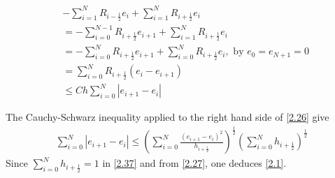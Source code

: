 \documentclass[a4paper]{article}
\numberwithin{equation}{section}
\begin{document}
\begin{align}
& - \sum\limits_{i = 1}^N {{R_{i - \frac{1}{2}}}{e_i}}  + \sum\limits_{i = 1}^N {{R_{i + \frac{1}{2}}}{e_i}} \\
  &=  - \sum\limits_{i = 0}^{N - 1} {{R_{i + \frac{1}{2}}}{e_{i + 1}}}  + \sum\limits_{i = 1}^N {{R_{i + \frac{1}{2}}}{e_i}} \\
& =  - \sum\limits_{i = 0}^N {{R_{i + \frac{1}{2}}}{e_{i + 1}}}  + \sum\limits_{i = 0}^N {{R_{i + \frac{1}{2}}}{e_i}} ,\mbox{ by } {e_0} = {e_{N + 1}} = 0\\
& = \sum\limits_{i = 0}^N {{R_{i + \frac{1}{2}}}\left( {{e_i} - {e_{i + 1}}} \right)} \\
& \le Ch\sum\limits_{i = 0}^N {\left| {{e_{i + 1}} - {e_i}} \right|} 
\end{align}

The Cauchy-Schwarz inequality applied to the right hand side of \eqref{2.26} give
\begin{align}
\label{2.37}
\sum\limits_{i = 0}^N {\left| {{e_{i + 1}} - {e_i}} \right|}  \le {\left( {\sum\limits_{i = 0}^N {\frac{{{{\left( {{e_{i + 1}} - {e_i}} \right)}^2}}}{{{h_{i + \frac{1}{2}}}}}} } \right)^{\frac{1}{2}}}{\left( {\sum\limits_{i = 0}^N {{h_{i + \frac{1}{2}}}} } \right)^{\frac{1}{2}}}
\end{align}
Since $\sum\limits_{i = 0}^N {{h_{i + \frac{1}{2}}}}  = 1$ in \eqref{2.37} and from \eqref{2.27}, one deduces \eqref{2.1}.
\end{document}
